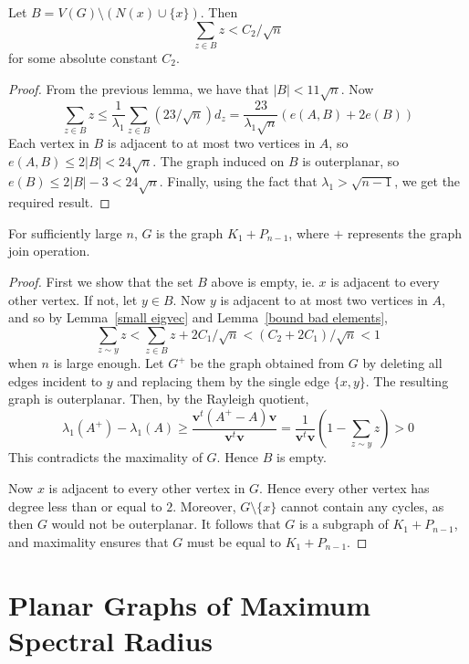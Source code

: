 \begin{lemma}\label{bound bad elements}
 Let $B = V(G) \setminus (N(x) \cup \{x\})$.  Then
  \[ \sum_{z \in B} z < C_2 / \sqrt{n} \]
 for some absolute constant $C_2$.
\end{lemma}
\begin{proof}
From the previous lemma, we have that $|B| < 11 \sqrt{n}$.  Now
 \[ \sum_{z \in B} z \leq \frac{1}{\lambda_1} \sum_{z \in B} \left(23 / \sqrt{n}\right) d_z = \frac{23}{\lambda_1 \sqrt{n}} \left( e(A,B) + 2 e(B)\right) \]
Each vertex in $B$ is adjacent to at most two vertices in $A$, so $e(A,B) \leq 2 |B| < 24 \sqrt{n}$.  The graph induced on $B$ is outerplanar, so
$e(B) \leq 2|B| - 3 < 24 \sqrt{n}$.  Finally, using the fact that $\lambda_1 > \sqrt{n-1}$, we get the required result.
\end{proof}

\begin{theorem}
 For sufficiently large $n$, $G$ is the graph $K_1 + P_{n-1}$, where $+$ represents the graph join operation.
\end{theorem}
\begin{proof}
First we show that the set $B$ above is empty, ie. $x$ is adjacent
to every other vertex.  If not, let $y \in B$.  Now $y$ is adjacent to at
most two vertices in $A$, and so by Lemma~\ref{small eigvec} and Lemma~\ref{bound bad elements}, 
 \[ \sum_{z \sim y} z < \sum_{z \in B} z + 2 C_1 / \sqrt{n} < (C_2 + 2 C_1) / \sqrt{n} < 1\]
when $n$ is large enough.  Let $G^+$ be the graph obtained
from $G$ by deleting all edges incident to $y$ and replacing them by the single edge $\{x,y\}$.  The resulting graph is outerplanar.  Then,
by the Rayleigh quotient,
 \[ \lambda_1(A^+) - \lambda_1(A) \geq \frac{\textbf{v}^t(A^+ - A)\textbf{v}}{\textbf{v}^t\textbf{v}} = \frac{1}{\textbf{v}^t\textbf{v}} \left(1 - \sum_{z \sim y} z\right) > 0\]
This contradicts the maximality of $G$.  Hence $B$ is empty.


Now $x$ is adjacent to every other vertex in $G$.  Hence every other vertex has degree less than or equal to $2$.  Moreover,
$G \setminus \{x\}$ cannot contain any cycles, as then $G$ would not be outerplanar.
It follows that $G$ is a subgraph of $K_1 + P_{n-1}$, and maximality ensures that $G$ must be equal to $K_1 + P_{n-1}$.
\end{proof}

\section{Planar Graphs of Maximum Spectral Radius}\label{planar}

